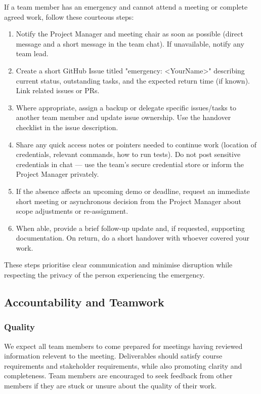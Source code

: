 \documentclass{article}
\begin{document}
\begin{enumerate}
If a team member has an emergency and cannot attend a meeting or complete agreed work, follow these courteous steps:
\begin{enumerate}
  \item Notify the Project Manager and meeting chair as soon as possible (direct message and a short message in the team chat). If unavailable, notify any team lead.
  \item Create a short GitHub Issue titled "emergency: <YourName>" describing current status, outstanding tasks, and the expected return time (if known). Link related issues or PRs.
  \item Where appropriate, assign a backup or delegate specific issues/tasks to another team member and update issue ownership. Use the handover checklist in the issue description.
  \item Share any quick access notes or pointers needed to continue work (location of credentials, relevant commands, how to run tests). Do not post sensitive credentials in chat — use the team's secure credential store or inform the Project Manager privately.
  \item If the absence affects an upcoming demo or deadline, request an immediate short meeting or asynchronous decision from the Project Manager about scope adjustments or re-assignment.
  \item When able, provide a brief follow-up update and, if requested, supporting documentation. On return, do a short handover with whoever covered your work.
\end{enumerate}

These steps prioritise clear communication and minimise disruption while respecting the privacy of the person experiencing the emergency.

\subsection*{Accountability and Teamwork}

\subsubsection*{Quality} 


We expect all team members to come prepared for meetings having reviewed information relevent to the meeting. Deliverables should satisfy course requirements and stakeholder requirements, while also promoting clarity and completeness.
Team members are encouraged to seek feedback from other members if they are stuck or unsure about the quality of their work.


\end{enumerate}
\end{document}
